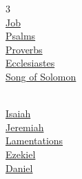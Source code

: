 \begin{multicols}{3}
\\
\hspace{1em}\hyperlink{book-job}{Job}\\
\hspace{1em}\hyperlink{book-psalms}{Psalms}\\
\hspace{1em}\hyperlink{book-proverbs}{Proverbs}\\
\hspace{1em}\hyperlink{book-ecclesiastes}{Ecclesiastes}\\
\hspace{1em}\hyperlink{book-songofsolomon}{Song of Solomon}\\
\vspace{4pt}

\columnbreak

\\
\hspace{1em}\hyperlink{book-isaiah}{Isaiah}\\
\hspace{1em}\hyperlink{book-jeremiah}{Jeremiah}\\
\hspace{1em}\hyperlink{book-lamentations}{Lamentations}\\
\hspace{1em}\hyperlink{book-ezekiel}{Ezekiel}\\
\hspace{1em}\hyperlink{book-daniel}{Daniel}\\
\vspace{4pt}


\end{multicols}
